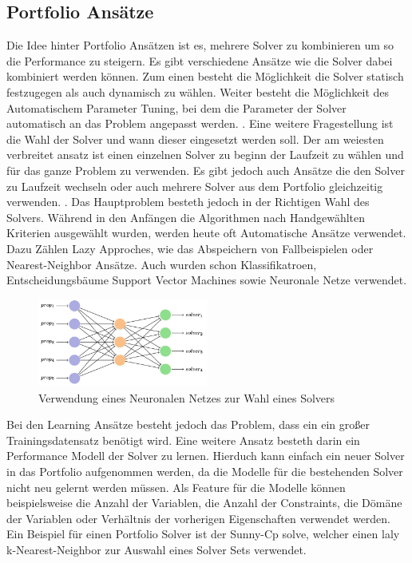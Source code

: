 \subsection{Portfolio Ansätze}
\label{sec:Portfolio Ansätze}
Die Idee hinter Portfolio Ansätzen ist es, mehrere Solver zu kombinieren um so
die Performance zu steigern. Es gibt verschiedene Ansätze wie die Solver dabei 
kombiniert werden können. Zum einen besteht die Möglichkeit die Solver statisch
festzugegen als auch dynamisch zu wählen. Weiter besteht die Möglichkeit des
Automatischem Parameter Tuning, bei dem die Parameter der Solver automatisch an 
das Problem angepasst werden. \cite[8-11]{kotth12jo}. Eine weitere Fragestellung
ist die Wahl der Solver und wann dieser eingesetzt werden soll. Der am weiesten
verbreitet ansatz ist einen einzelnen Solver zu beginn der Laufzeit zu wählen
und für das ganze Problem zu verwenden. Es gibt jedoch auch Ansätze die den
Solver zu Laufzeit wechseln oder auch mehrere Solver aus dem Portfolio
gleichzeitig verwenden. \cite[11-14]{kotth12jo}. Das Hauptproblem besteth jedoch
in der Richtigen Wahl des Solvers. Während in den Anfängen die Algorithmen nach
Handgewählten Kriterien ausgewählt wurden, werden heute oft Automatische Ansätze
verwendet. Dazu Zählen Lazy Approches, wie das Abspeichern von Fallbeispielen
oder Nearest-Neighbor Ansätze. Auch wurden schon Klassifikatroen,
Entscheidungsbäume Support Vector Machines sowie Neuronale Netze verwendet.
\begin{figure}[h]
    \centering
    \includegraphics[width=0.5\textwidth]{figures/Neuronal Nework to choose Solver [popes22jo]}
    \caption{Verwendung eines Neuronalen Netzes zur Wahl eines Solvers \cite[105]{popes22jo}}
    \label{fig:bild}
\end{figure}
Bei den Learning Ansätze besteht jedoch das Problem, dass ein ein großer
Trainingsdatensatz benötigt wird.\cite[15-16]{kotth12jo} Eine weitere Ansatz
besteth darin ein Performance Modell der Solver zu lernen. Hierduch kann einfach
ein neuer Solver in das Portfolio aufgenommen werden, da die Modelle für die
bestehenden Solver nicht neu gelernt werden müssen. \cite[18]{kotth12jo}
Als Feature für die Modelle können beispielsweise die Anzahl der Variablen, die
Anzahl der Constraints, die Dömäne der Variablen oder Verhältnis der vorherigen
Eigenschaften verwendet werden. \cite[22]{kotth12jo} Ein Beispiel für einen
Portfolio Solver ist der Sunny-Cp solve, welcher einen laly k-Nearest-Neighbor 
zur Auswahl eines Solver Sets verwendet. \cite[4]{amadi15jo}


